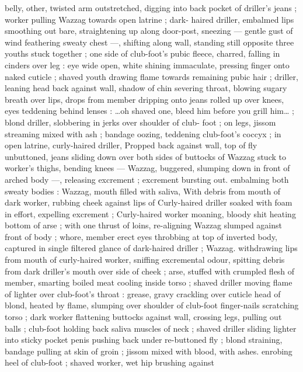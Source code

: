 belly, other, twisted arm outstretched, digging into back pocket of 
driller's jeans ; worker pulling Wazzag towards open latrine ; dark- 
haired driller, embalmed lips smoothing out bare, straightening up 
along door-post, sneezing --- gentle gust of wind feathering sweaty 
chest ---, shifting along wall, standing still opposite three youths 
stuck together ; one side of club-foot's pubic fleece, charred, falling 
in cinders over leg : eye wide open, white shining immaculate, 
pressing finger onto naked cuticle ; shaved youth drawing flame 
towards remaining pubic hair ; driller, leaning head back against wall, 
shadow of chin severing throat, blowing sugary breath over lips, 
drops from member dripping onto jeans rolled up over knees, eyes 
teddening behind lenses : {\gl}{\ldots}oh shaved one, bleed him before you 
grill him{\ldots}{\gr} ; blond driller, slobbering in jerks over shoulder of club- 
foot ; on legs, jissom streaming mixed with ash ; bandage oozing, 
teddening club-foot's coccyx ; in open latrine, curly-haired driller, 
Propped back against wall, top of fly unbuttoned, jeans sliding down 
over both sides of buttocks of Wazzag stuck to worker's thighs, 
bending knees --- Wazzag, buggered, slumping down in front of 
arched body ---, releasing excrement ; excrement bursting out. 
embalming both sweaty bodies : Wazzag, mouth filled with saliva, 
With debris from mouth of dark worker, rubbing cheek against lips of 
Curly-haired driller soaked with foam in effort, expelling excrement ; 
Curly-haired worker moaning, bloody shit heating bottom of arse ; 
with one thrust of loins, re-aligning Wazzag slumped against front of 
body ; whore, member erect eyes throbbing at top of inverted body, 
captured in single filtered glance of dark-haired driller ; Wazzag. 
withdrawing lips from mouth of curly-haired worker, sniffing 
excremental odour, spitting debris from dark driller's mouth over side 
of cheek ; arse, stuffed with crumpled flesh of member, smarting 
boiled meat cooling inside torso ; shaved driller moving flame of 
lighter over club-foot's throat : grease, gravy crackling over cuticle 
head of blond, heated by flame, slumping over shoulder of club-foot 
finger-nails scratching torso ; dark worker flattening buttocks against 
wall, crossing legs, pulling out balls ; club-foot holding back saliva 
muscles of neck ; shaved driller sliding lighter into sticky pocket 
penis pushing back under re-buttoned fly ; blond straining, bandage 
pulling at skin of groin ; jissom mixed with blood, with ashes. 
enrobing heel of club-foot ; shaved worker, wet hip brushing against 
